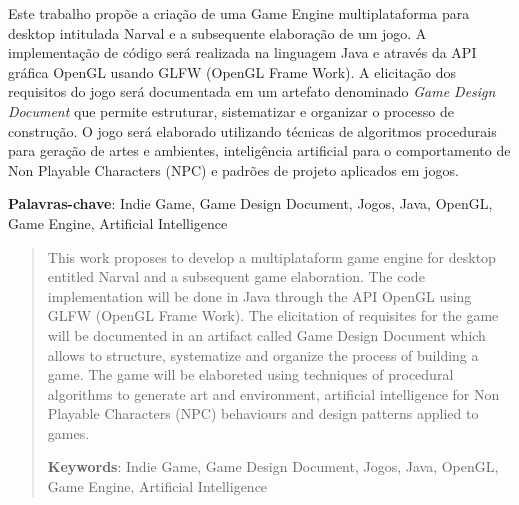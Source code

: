 \documentclass[12pt, 
openright, 
oneside, 
a4paper,    
brazil]{facom-ufu-abntex2}
\begin{document}
\begin{resumo} 

Este trabalho propõe a criação de uma Game Engine multiplataforma para desktop intitulada Narval e a subsequente elaboração de um jogo.
A implementação de código será realizada na linguagem Java e através da API gráfica OpenGL usando GLFW (OpenGL Frame Work). 
A elicitação dos requisitos do jogo será documentada em um artefato denominado \textit{Game Design Document} que permite estruturar, sistematizar e organizar 
o processo de construção.
O jogo será elaborado utilizando técnicas de algoritmos procedurais para geração de artes e ambientes, inteligência artificial para o comportamento de Non Playable Characters (NPC) e padrões de projeto aplicados em jogos.
 
 \vspace{\onelineskip}
 \noindent
 \textbf{Palavras-chave}: Indie Game, Game Design Document, Jogos, Java, OpenGL, Game Engine, Artificial Intelligence
\end{resumo}

\begin{abstract} 
This work proposes to develop a multiplataform game engine for desktop entitled Narval and a subsequent game elaboration. 
The code implementation will be done in Java through the API OpenGL using GLFW (OpenGL Frame Work).
The elicitation of requisites for the game will be documented in an artifact called Game Design Document which allows to structure, systematize and organize the process of building a game.
The game will be elaboreted using techniques of procedural algorithms to generate art and environment, artificial intelligence for Non Playable Characters (NPC) behaviours and design patterns applied to games.

 \vspace{\onelineskip}
    
 \noindent
 \textbf{Keywords}: Indie Game, Game Design Document, Jogos, Java, OpenGL, Game Engine, Artificial Intelligence %
\end{abstract}
\cleardoublepage
\end{document}
